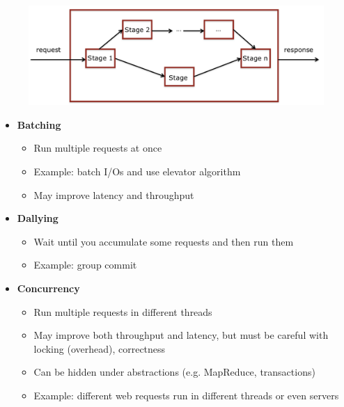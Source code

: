\begin{figure}[h]
  \begin{minipage}{1.0\linewidth}
    \begin{center}
      \includegraphics[scale=0.2]{graphics/fast_path.png}
    \end{center}
  \end{minipage}
\end{figure}

\begin{itemize}
\item \textbf{Batching}
  \begin{itemize}
  \item Run multiple requests at once
  \item Example: batch I/Os and use elevator algorithm
  \item May improve latency and throughput
  \end{itemize}
\end{itemize}

\begin{itemize}
\item \textbf{Dallying}
  \begin{itemize}
  \item Wait until you accumulate some requests and then run them
  \item Example: group commit
  \end{itemize}
\end{itemize}

\begin{itemize}
\item \textbf{Concurrency}
  \begin{itemize}
  \item Run multiple requests in different threads
  \item May improve both throughput and latency, but must
    be careful with locking (overhead), correctness
  \item Can be hidden under abstractions
    (e.g. MapReduce, transactions)
  \item Example: different web requests run in different threads
    or even servers
  \end{itemize}
\end{itemize}


